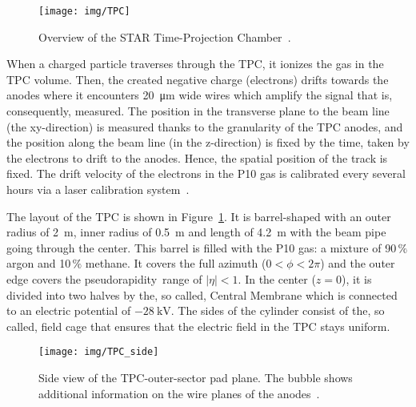 \begin{figure}[htb]
\begin{center}
 \texttt{[image: img/TPC]}\\
\end{center}
\caption[Overview of the STAR Time-Projection Chamber.]{\label{TPC}Overview of the STAR Time-Projection Chamber~\cite{TpcNim}.}
\end{figure}


 

When a charged particle traverses through the TPC, it ionizes the gas in the TPC volume. Then, the created negative 
charge (electrons) drifts towards the anodes where it encounters \SI{20}{\micro\metre} wide wires which amplify the signal that is,
consequently, measured. The position in the transverse plane to the beam line (the xy-direction) is measured thanks to the
granularity of the TPC anodes, and the position along the beam line (in the z-direction) is fixed by the time, taken by
the electrons to drift to the anodes. Hence, the spatial position of the track is fixed. The drift velocity of the electrons
in the P10 gas is calibrated every several hours via a laser calibration system~\cite{laser}. 


The layout of the TPC is shown in Figure~\ref{TPC}. It is barrel-shaped with an outer radius of \SI{2}{\metre}, inner radius of \SI{0.5}{\metre} and length of \SI{4.2}{\metre}
with the beam pipe going through the center. This barrel is filled with the P10 gas: a mixture of 90$\,\%$ argon and 10$\,\%$ methane. It covers the full azimuth ($0 < \phi < 2\pi$) and the outer edge covers the
pseudorapidity\ range of $|\eta| < 1$. 
In the center ($z = 0$), it is divided into two halves by the, so called, Central Membrane which is connected to an electric 
potential of $-\SI{28}{\kilo\volt}$\@.  The sides of the cylinder consist of the, so called, field cage that ensures that the electric field in the TPC stays uniform.

\begin{figure}[htb]
\begin{center}
 \texttt{[image: img/TPC\_side]}\\
\end{center}
\caption[Side view of the TPC-outer-sector pad plane.]{\label{TPCside}Side view of the TPC-outer-sector pad plane. The bubble shows additional information on the wire planes of the anodes~\cite{TpcNim}.}
\end{figure}

